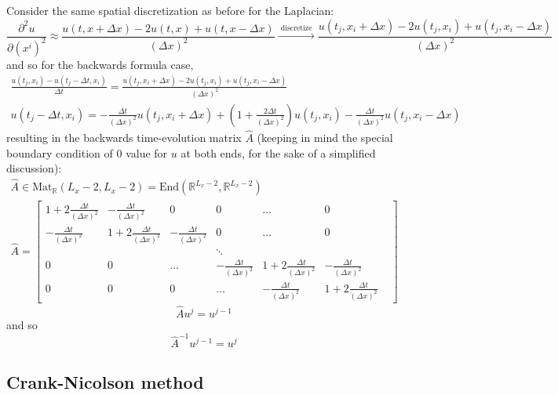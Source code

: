 \documentclass[10pt]{amsart}
\begin{document}
\begin{multicols*}{2}
Consider the same spatial discretization as before for the Laplacian:
\[
\frac{ \partial^2 u}{ \partial (x^i)^2 } \approx \frac{ u(t,x + \Delta x) - 2 u(t,x) + u(t, x-\Delta x) }{ (\Delta x)^2 }  \xrightarrow{ \text{ discretize } } \frac{ u(t_j  , x_i+\Delta x) - 2 u(t_j,x_i) + u(t_j,x_i-\Delta x) }{ ( \Delta x)^2 } 
\]
and so for the backwards formula case, 
\begin{equation}
  \begin{gathered}
 \frac{ u(t_j,x_i) - u(t_j-\Delta t, x_i) }{ \Delta t}   =  \frac{ u(t_j  , x_i+\Delta x) - 2 u(t_j,x_i) + u(t_j,x_i-\Delta x) }{ ( \Delta x)^2 }  \\
 u(t_j - \Delta t, x_i) = -\frac{ \Delta t}{ (\Delta x)^2 } u(t_j,x_i + \Delta x) + \left( 1 + \frac{ 2 \Delta t}{ (\Delta x)^2 } \right) u (t_j,x_i) - \frac{ \Delta t}{ (\Delta x)^2 } u(t_j,x_i - \Delta x)
    \end{gathered}
 \end{equation}
resulting in the backwards time-evolution matrix $\widehat{A}$ (keeping in mind the special boundary condition of $0$ value for $u$ at both ends, for the sake of a simplified discussion):
\begin{equation}
  \begin{gathered}
    \widehat{A} \in \text{Mat}_{\mathbb{R}}(L_x-2,L_x-2) = \text{End}(\mathbb{R}^{L_x-2}, \mathbb{R}^{L_x-2}) \\
    \widehat{A} = \left[ \begin{matrix}
        1 + 2  \frac{ \Delta t}{ (\Delta x)^2 } &  -\frac{ \Delta t}{ (\Delta x)^2 } & 0 & 0 & \dots  &  0  \\
         -\frac{ \Delta t}{ (\Delta x)^2 } & 1 +  2 \frac{ \Delta t}{ (\Delta x)^2 } &  -\frac{ \Delta t}{ (\Delta x)^2 } & 0 &  \dots & 0  \\ 
                 &  &  & \ddots  &   &   & \\
         0   & 0  & \dots  &   -\frac{ \Delta t}{ (\Delta x)^2 } & 1 + 2  \frac{ \Delta t}{ (\Delta x)^2 } & - \frac{ \Delta t}{ (\Delta x)^2 }  \\
         0 & 0 & 0 & \dots &  - \frac{ \Delta t}{ (\Delta x)^2 } & 1 + 2  \frac{ \Delta t}{ (\Delta x)^2 } 
        \end{matrix} \right]
  \end{gathered}
\end{equation}  
\[
\widehat{A}u^j = u^{j-1}
\]
and so
\[
\widehat{A}^{-1}u^{j-1} = u^j
\]

\subsection{Crank-Nicolson method}


\end{multicols*}
\end{document}
